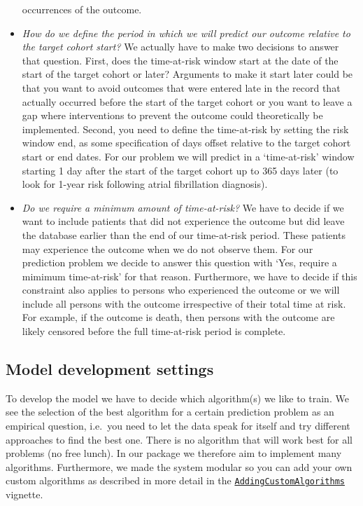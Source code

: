 \documentclass[
]{article}
\begin{document}
\begin{itemize}
  occurrences of the outcome.
\item
  \emph{How do we define the period in which we will predict our outcome
  relative to the target cohort start?} We actually have to make two
  decisions to answer that question. First, does the time-at-risk window
  start at the date of the start of the target cohort or later?
  Arguments to make it start later could be that you want to avoid
  outcomes that were entered late in the record that actually occurred
  before the start of the target cohort or you want to leave a gap where
  interventions to prevent the outcome could theoretically be
  implemented. Second, you need to define the time-at-risk by setting
  the risk window end, as some specification of days offset relative to
  the target cohort start or end dates. For our problem we will predict
  in a `time-at-risk' window starting 1 day after the start of the
  target cohort up to 365 days later (to look for 1-year risk following
  atrial fibrillation diagnosis).
\item
  \emph{Do we require a minimum amount of time-at-risk?} We have to
  decide if we want to include patients that did not experience the
  outcome but did leave the database earlier than the end of our
  time-at-risk period. These patients may experience the outcome when we
  do not observe them. For our prediction problem we decide to answer
  this question with `Yes, require a mimimum time-at-risk' for that
  reason. Furthermore, we have to decide if this constraint also applies
  to persons who experienced the outcome or we will include all persons
  with the outcome irrespective of their total time at risk. For
  example, if the outcome is death, then persons with the outcome are
  likely censored before the full time-at-risk period is complete.
\end{itemize}

\hypertarget{model-development-settings}{%
\subsection{Model development
settings}\label{model-development-settings}}

To develop the model we have to decide which algorithm(s) we like to
train. We see the selection of the best algorithm for a certain
prediction problem as an empirical question, i.e.~you need to let the
data speak for itself and try different approaches to find the best one.
There is no algorithm that will work best for all problems (no free
lunch). In our package we therefore aim to implement many algorithms.
Furthermore, we made the system modular so you can add your own custom
algorithms as described in more detail in the
\href{Link\%20to\%20be\%20added}{\texttt{AddingCustomAlgorithms}}
vignette.
\end{document}

